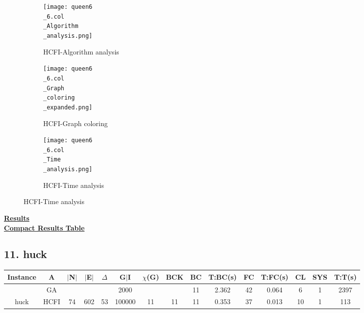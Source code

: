 \documentclass[10pt]{article}
\begin{document}
\graphicspath{{./Core1/Solutions/HCFI/queen6\_6.col}}
\begin{figure}[H]
\begin{subfigure}{.33\textwidth}
  \centering
  \texttt{[image: queen6\\\_6.col\\\_Algorithm\\\_analysis.png]}
  \caption{HCFI-Algorithm analysis}
   \label{fig:subfig1}
\end{subfigure}%
\begin{subfigure}{.33\textwidth}
  \centering
  \texttt{[image: queen6\\\_6.col\\\_Graph\\\_coloring\\\_expanded.png]}
  \caption{HCFI-Graph coloring}
  \label{fig:subfig2}
\end{subfigure}
\begin{subfigure}{.33\textwidth}
  \centering
  \texttt{[image: queen6\\\_6.col\\\_Time\\\_analysis.png]}
  \caption{HCFI-Time analysis}
  \end{subfigure}
\end{figure}
\vspace{2cm}
\begin{center}
\hyperlink{page.8}{\textbf{Results}}\\
\vspace{0.5cm}
\hyperlink{page.71}{\textbf{Compact Results Table}}
\end{center}
\pagebreak
\subsection*{\hspace{0,9073976cm} 11. huck}
\begin{table}[H]
\centering
\begin{tabular}{|c|c|c|c|c|c|c|c|c|c|c|c|c|c|c|}
\hline
Instance& A &$|$N$|$ & $|$E$|$ & $\Delta$ & G$|$I & $\chi$(G) &BCK&BC & T:BC(s) & FC & T:FC(s) & CL & SYS & T:T(s) \\ \hline \hline
&GA&       &                   &                     & 2000        &     \cellcolor{yellow} & {\cellcolor{yellow}}& {{\cellcolor{green}11}}
&2.362   &42        & 0.064                  &    6                &1         & 2397       \\ \cline{2-2} \cline{6-6} \cline{9-15}
 \multirow{-2}{*}{huck} &HCFI   &\multirow{-2}{*}{74}   &\multirow{-2}{*}{602}     &\multirow{-2}{*}{53}     &100000      &\multirow{-2}{*}{\cellcolor{yellow}11}      & \multirow{-2}{*}{\cellcolor{yellow}11}    &{\cellcolor{green}11}     & 0.353         &37    &0.013         &10    &1     &113        \\ \hline 
\end{tabular}
\end{table}
\end{document}

